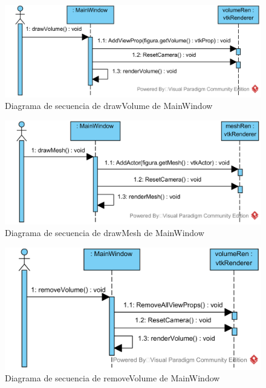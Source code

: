 \begin{figure}[H]
	\centering
	\includegraphics[width=12cm]{imagenes/diagramas/secuencia/MainWindow_DrawVolume}
	\caption{Diagrama de secuencia de drawVolume de MainWindow}
	\label{fig:diagrama_secuencia_mainWindow_drawVolume}
\end{figure}

\begin{figure}[H]
	\centering
	\includegraphics[width=12cm]{imagenes/diagramas/secuencia/MainWindow_DrawMesh}
	\caption{Diagrama de secuencia de drawMesh de MainWindow}
	\label{fig:diagrama_secuencia_mainWindow_drawMesh}
\end{figure}

\begin{figure}[H]
	\centering
	\includegraphics[width=12cm]{imagenes/diagramas/secuencia/MainWindow_RemoveVolume}
	\caption{Diagrama de secuencia de removeVolume de MainWindow}
	\label{fig:diagrama_secuencia_mainWindow_removeVolume}
\end{figure}

